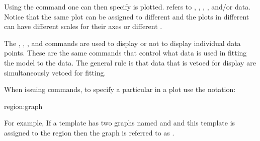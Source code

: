 Using the  command one can then specify  is
plotted.  refers to , , ,
, and/or  data.  Notice that the same 
plot can be assigned to different  and the plots in different
 can have different scales for their axes or different
.


The , , ,
and  commands are used to display or not to display
individual data points. These are the same commands that control what
data is used in fitting the model to the data. The general rule is
that data that is vetoed for display are simultaneously vetoed for fitting.

When issuing \tao commands, to specify a particular  in a plot
use the notation:
\begin{example}
  region:graph
\end{example}
For example, If a template has two graphs named  and  and
this template is assigned to the  region then the  graph
is referred to as . 

